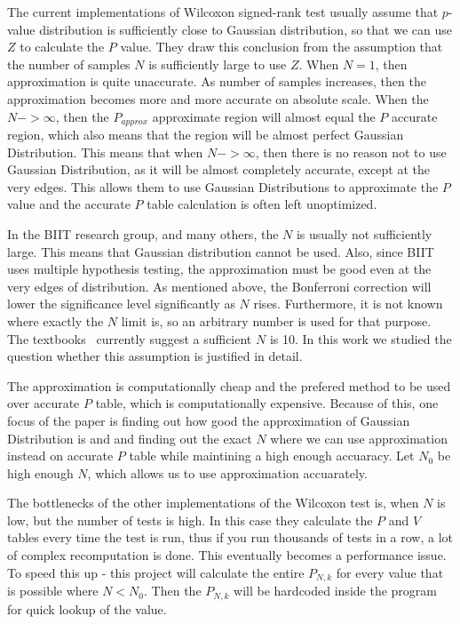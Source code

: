 \documentclass[12pt]{article}
\begin{document}
The current implementations of Wilcoxon signed-rank test usually assume that $p$-value distribution is sufficiently close to Gaussian distribution, so that we can use $Z$ to calculate the $P$ value. They draw this conclusion from the assumption that the number of samples $N$ is sufficiently large to use $Z$. When $N = 1$, then approximation is quite unaccurate. As number of samples increases, then the approximation becomes more and more accurate on absolute scale. When the $N->\infty$, then the $P_{approx}$ approximate region will almost equal the $P$ accurate region, which also means that the region will be almost perfect Gaussian Distribution. This means that when $N->\infty$, then there is no reason not to use Gaussian Distribution, as it will be almost completely accurate, except at the very edges. This allows them to use Gaussian Distributions to approximate the $P$ value and the accurate $P$ table calculation is often left unoptimized.

In the BIIT research group, and many others, the $N$ is usually not sufficiently large. This means that Gaussian distribution cannot be used. Also, since BIIT uses multiple hypothesis testing, the approximation must be good even at the very edges of distribution. As mentioned above, the Bonferroni correction will lower the significance level significantly as $N$ rises. Furthermore, it is not known where exactly the $N$ limit is, so an arbitrary number is used for that purpose. The textbooks~\cite{lowry_concepts} currently suggest a sufficient $N$ is 10. In this work we studied the question whether this assumption is justified in detail.

The approximation is computationally cheap and the prefered method to be used over accurate $P$ table, which is computationally expensive. Because of this, one focus of the paper is finding out how good the approximation of Gaussian Distribution is and and finding out the exact $N$ where we can use approximation instead on accurate $P$ table while maintining a high enough accuaracy. Let $N_0$ be high enough $N$, which allows us to use approximation accuarately.

The bottlenecks of the other implementations of the Wilcoxon test is, when $N$ is low, but the number of tests is high. In this case they calculate the $P$ and $V$ tables every time the test is run, thus if you run thousands of tests in a row, a lot of complex recomputation is done. This eventually becomes a performance issue. To speed this up - this project will calculate the entire $P_{N, k}$ for every value that is possible where $N < N_0$. Then the $P_{N, k}$ will be hardcoded inside the program for quick lookup of the value.
\end{document}
